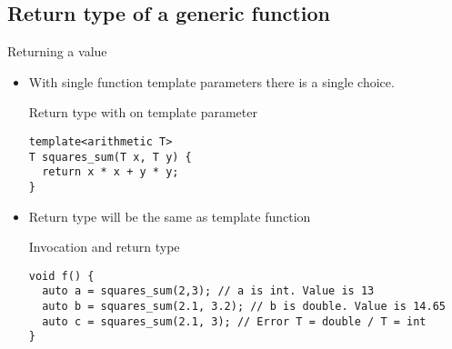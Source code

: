 \subsection{Return type of a generic function}

\begin{frame}[t,fragile]{Returning a value}


\begin{itemize}
  \item With single function template parameters there is a single choice.

\begin{block}{Return type with on template parameter}
\begin{lstlisting}
template<arithmetic T>
T squares_sum(T x, T y) {
  return x * x + y * y;
}
\end{lstlisting}
\end{block}

  \item Return type will be the same as template function 

\begin{block}{Invocation and return type}
\begin{lstlisting}
void f() {
  auto a = squares_sum(2,3); // a is int. Value is 13
  auto b = squares_sum(2.1, 3.2); // b is double. Value is 14.65
  auto c = squares_sum(2.1, 3); // Error T = double / T = int
}
\end{lstlisting}
\end{block}

\end{itemize}
\end{frame}


